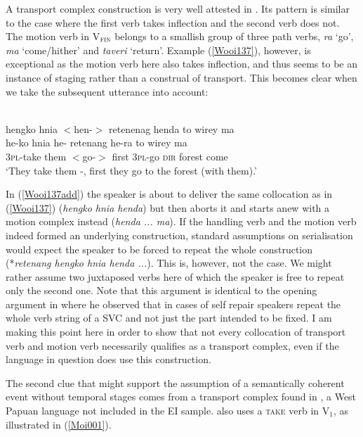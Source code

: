 A transport complex construction is very well attested in . Its pattern is similar to the  case where the first verb takes inflection and the second verb does not. The motion verb in V$_{\textsc{fin}}$ belongs to a smallish group of three path verbs, \textit{ra} `go', \textit{ma} `come/hither' and \textit{taveri} `return'. Example (\ref{Wooi137}), however, is exceptional as the motion verb here also takes inflection, and thus seems to be an instance of staging rather than a construal of transport. This becomes clear when we take the subsequent utterance into account:

\ea \label{Wooi137add}
\\
\glll hengko hnia $<$hen-$>$ retenenag henda to wirey ma \\
he-ko hnia he- retenang he-ra to wirey ma\\
\textsc{3}\textsc{pl}-take them $<$go-$>$ first \textsc{3}\textsc{pl}-go \textsc{dir} forest come \\
\glft `They take them -, first they go to the forest (with them).'\\
\z

In (\ref{Wooi137add}) the speaker is about to deliver the same collocation as in (\ref{Wooi137}) (\textit{hengko hnia henda}) but then aborts it and starts anew with a motion complex instead (\textit{henda ... ma}). If the handling verb and the motion verb indeed formed an underlying construction, standard assumptions on serialisation would expect the speaker to be forced to repeat the whole construction (*\textit{retenang hengko hnia henda ...}). This is, however, not the case. We might rather assume two juxtaposed verbs here of which the speaker is free to repeat only the second one. Note that this argument is identical to the opening argument in \citet{senft2008intro} where he observed that in cases of self repair  speakers repeat the whole verb string of a SVC and not just the part intended to be fixed. I am making this point here in order to show that not every collocation of transport verb and motion verb necessarily qualifies as a transport complex, even if the language in question does use this construction.

The second clue that might support the assumption of a semantically coherent event without temporal stages comes from a transport complex found in , a West Papuan language not included in the EI sample.  also uses a \textsc{take} verb in V$_{1}$, as illustrated in (\ref{Moi001}).

